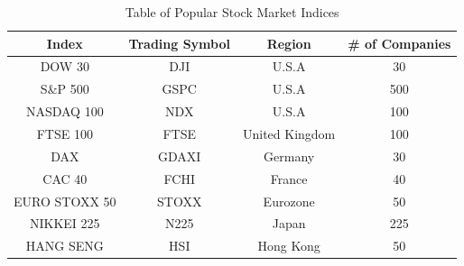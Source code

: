 \documentclass{UoYCSproject}
\begin{document}
\begin{table}[h]
    \centering
    \begin{tabular}{|c|c|c|c|} \hline
        \textbf{Index} & \textbf{Trading Symbol} & \textbf{Region} & \textbf{\# of Companies} \\ \hline
        DOW 30 & DJI & U.S.A & 30 \\
        S\&P 500 & GSPC & U.S.A & 500 \\
        NASDAQ 100 & NDX & U.S.A & 100 \\
        FTSE 100 & FTSE & United Kingdom & 100 \\
        DAX & GDAXI & Germany & 30 \\
        CAC 40 & FCHI & France & 40 \\
        EURO STOXX 50 & STOXX & Eurozone & 50 \\
        NIKKEI 225 & N225 & Japan & 225 \\
        HANG SENG & HSI & Hong Kong & 50 \\
        \hline
    \end{tabular}
    \caption{Table of Popular Stock Market Indices}
    \label{tab:indices}
\end{table}

\printbibliography
\end{document}

